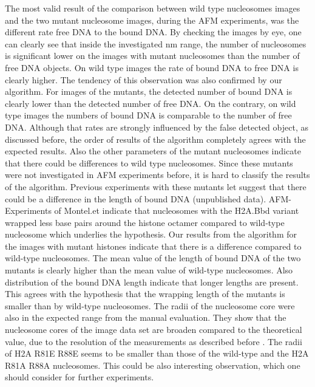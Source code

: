 \documentclass{article}
\begin{document}
The most valid result of the comparison between wild type nucleosomes images and the two mutant nucleosome images, during the AFM experiments, was the different rate free DNA to the bound DNA. By checking the images by eye, one can clearly see that inside the investigated nm range, the number of nucleosomes is significant lower on the images with mutant nucleosomes than the number of free DNA objects. On wild type images the rate of bound DNA to free DNA is clearly higher. The tendency of this observation was also confirmed by our algorithm. For images of the mutants, the detected number of bound DNA is clearly lower than the detected number of free DNA. On the contrary, on wild type images the numbers of bound DNA is comparable to the number of free DNA. Although that rates are strongly influenced by the false detected object, as discussed before, the order of results of the algorithm completely agrees with the expected results. 
Also the other parameters of the mutant nucleosomes indicate that there could be differences to wild type nucleosomes. Since these mutants were not investigated in AFM experiments before, it is hard to classify the results of the algorithm. Previous experiments with these mutants let suggest that there could be a difference in the length of bound DNA (unpublished data). AFM-Experiments of Montel.et indicate that nucleosomes with the H2A.Bbd variant wrapped less base pairs around the histone octamer compared to wild-type nucleosome \cite{montel2007atomic} which underlies the hypothesis.
Our results from the algorithm for the images with mutant histones indicate that there is a difference compared to wild-type nucleosomes. The mean value of the length of bound DNA of the two mutants is clearly higher than the mean value of wild-type nucleosomes. Also distribution of the bound DNA length indicate that longer lengths are present. This agrees with the hypothesis that the wrapping length of the mutants is smaller than by wild-type nucleosomes.
The radii of the nucleosome core were also in the expected range from the manual evaluation. They show that the nucleosome cores of the image data set are broaden compared to the theoretical value, due to the resolution of the measurements as described before \cite{bussiek2005dna}. The radii of H2A R81E R88E seems to be smaller than those of the wild-type and the H2A R81A R88A nucleosomes. This could be also interesting observation, which one should consider for further experiments.
\end{document}
